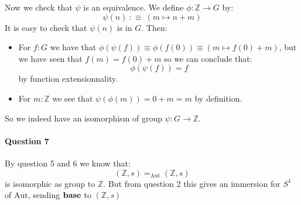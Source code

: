 \documentclass{article}[6pt]%
\begin{document}
Now we check that $\psi$ is an equivalence. We define $\phi : \mathbb{Z} \rightarrow G$ by:
\[\psi(n) \ :\equiv\ (m\mapsto n+m)\]
It is easy to check that $\psi(n)$ is in $G$. Then:

\begin{itemize}
\item For $f:G$ we have that $\phi(\psi(f)) \equiv \phi(f(0)) \equiv (m\mapsto f(0)+m)$, but we have seen that $f(m) = f(0) + m$ so we can conclude that:
\[\phi(\psi(f)) = f\]
by function extensionnality.
\item For $m:\mathbb{Z}$ we see that $\psi(\phi(m)) = 0+m = m$ by definition.
\end{itemize}

So we indeed have an isomorphism of group $\psi : G \rightarrow \mathbb{Z}$.


\paragraph{Question 7} By question 5 and 6 we know that: 
\[(\mathbb{Z},s)=_{\mathrm{Aut}}(\mathbb{Z},s)\]
is isomorphic as group to $\mathbb{Z}$. But from question 2 this gives an immersion for $S^1$ of $\mathrm{Aut}$, sending $\mathrm{\bf base}$ to $(\mathbb{Z},s)$

\end{document}
